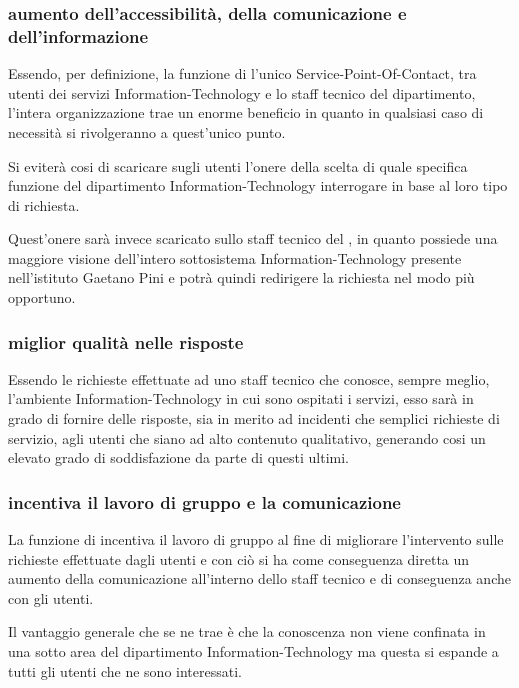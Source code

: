 \subsubsection[Aumento dell'accessibilità, della comunicazione e dell'informazione]{aumento dell'accessibilità, della comunicazione e dell'informazione}
Essendo, per definizione, la funzione di  l'unico \ac{Service-Point-Of-Contact}, tra utenti dei servizi \acs{Information-Technology} e lo staff tecnico del dipartimento, l'intera organizzazione trae un enorme beneficio in quanto in qualsiasi caso di necessità si rivolgeranno a quest'unico punto.

Si eviterà cosi di scaricare sugli utenti l'onere della scelta di quale specifica funzione del dipartimento \acs{Information-Technology} interrogare in base al loro tipo di richiesta.

Quest'onere sarà invece scaricato sullo staff tecnico del , in quanto possiede una maggiore visione dell'intero sottosistema \acs{Information-Technology} presente nell'istituto Gaetano Pini e potrà quindi redirigere la richiesta nel modo più opportuno.

\subsubsection[Miglior qualità nelle risposte]{miglior qualità nelle risposte}
Essendo le richieste effettuate ad uno staff tecnico che conosce, sempre meglio, l'ambiente \acs{Information-Technology} in cui sono ospitati i servizi, esso sarà in grado di fornire delle risposte, sia in merito ad incidenti che semplici richieste di servizio, agli utenti che siano ad alto contenuto qualitativo, generando cosi un elevato grado di soddisfazione da parte di questi ultimi.

\subsubsection[Incentiva il lavoro di gruppo e la comunicazione]{incentiva il lavoro di gruppo e la comunicazione}
La funzione di  incentiva il lavoro di gruppo al fine di migliorare l'intervento sulle richieste effettuate dagli utenti e con ciò si ha come conseguenza diretta un aumento della comunicazione all'interno dello staff tecnico e di conseguenza anche con gli utenti.

Il vantaggio generale che se ne trae è che la conoscenza non viene confinata in una sotto area del dipartimento \acs{Information-Technology} ma questa si espande a tutti gli utenti che ne sono interessati.

